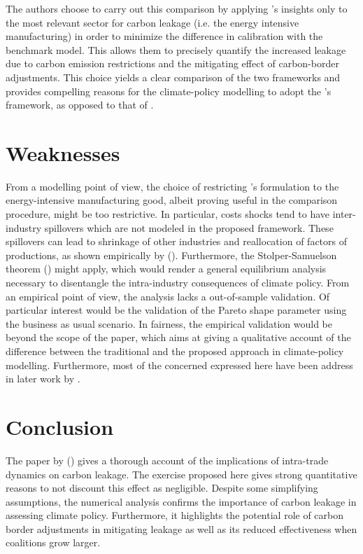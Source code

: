 \documentclass[american]{scrartcl}
\newcommand{\citein}[1]{\citeauthor{#1} (\citeyear{#1})}
\begin{document}
The authors choose to carry out this comparison by applying \citeauthor{Melitz2003}'s insights only to the most relevant sector for carbon leakage (i.e. the energy intensive manufacturing) in order to minimize the difference in calibration with the benchmark model. This allows them to precisely quantify the increased leakage due to carbon emission restrictions and the mitigating effect of carbon-border adjustments. This choice yields a clear comparison of the two frameworks and provides compelling reasons for the climate-policy modelling to adopt the \citeauthor{Melitz2003}'s framework, as opposed to that of \citeauthor{Armington1969}.


\section{Weaknesses}

From a modelling point of view, the choice of restricting \citeauthor{Melitz2003}'s formulation to the energy-intensive manufacturing good, albeit proving useful in the comparison procedure, might be too restrictive. In particular, costs shocks tend to have inter-industry spillovers which are not modeled in the proposed framework. These spillovers can lead to shrinkage of other industries and reallocation of factors of productions, as shown empirically by \citein{Melitz2012}. Furthermore, the Stolper-Samuelson theorem (\cite{Stolper1941}) might apply, which would render a general equilibrium analysis necessary to disentangle the intra-industry consequences of climate policy. From an empirical point of view, the analysis lacks a out-of-sample validation. Of particular interest would be the validation of the Pareto shape parameter using the business as usual scenario. In fairness, the empirical validation would be beyond the scope of the paper, which aims at giving a qualitative account of the difference between the traditional and the proposed approach in climate-policy modelling. Furthermore, most of the concerned expressed here have been address in later work by \citeauthor{Balistreri2012}.

\section{Conclusion}

The paper by \citein{Balistreri2012} gives a thorough account of the implications of intra-trade dynamics on carbon leakage. The exercise proposed here gives strong quantitative reasons to not discount this effect as negligible. Despite some simplifying assumptions, the numerical analysis confirms the importance of carbon leakage in assessing climate policy. Furthermore, it highlights the potential role of carbon border adjustments in mitigating leakage as well as its reduced effectiveness when coalitions grow larger.

\newpage
\nocite{*}
\printbibliography
\end{document}
